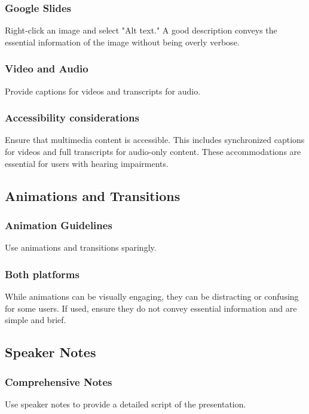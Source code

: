 \subsubsection{Google Slides}\label{ch15:sssec:slides-alt-text}
Right-click an image and select "Alt text." A good description conveys the essential information of the image without being overly verbose.

\subsubsection{Video and Audio}\label{ch15:sssec:video-audio}
Provide captions for videos and transcripts for audio.

\subsubsection{Accessibility considerations}\label{ch15:sssec:video-audio-a11y}
Ensure that multimedia content is accessible. This includes synchronized captions for videos and full transcripts for audio-only content. These accommodations are essential for users with hearing impairments.

\subsection{Animations and Transitions}\label{ch15:ssec:animations-transitions}

\subsubsection{Animation Guidelines}\label{ch15:sssec:animation-guidelines}
Use animations and transitions sparingly.

\subsubsection{Both platforms}\label{ch15:sssec:animations-both}
While animations can be visually engaging, they can be distracting or confusing for some users. If used, ensure they do not convey essential information and are simple and brief.

\subsection{Speaker Notes}\label{ch15:ssec:speaker-notes}

\subsubsection{Comprehensive Notes}\label{ch15:sssec:comprehensive-notes}
Use speaker notes to provide a detailed script of the presentation.

